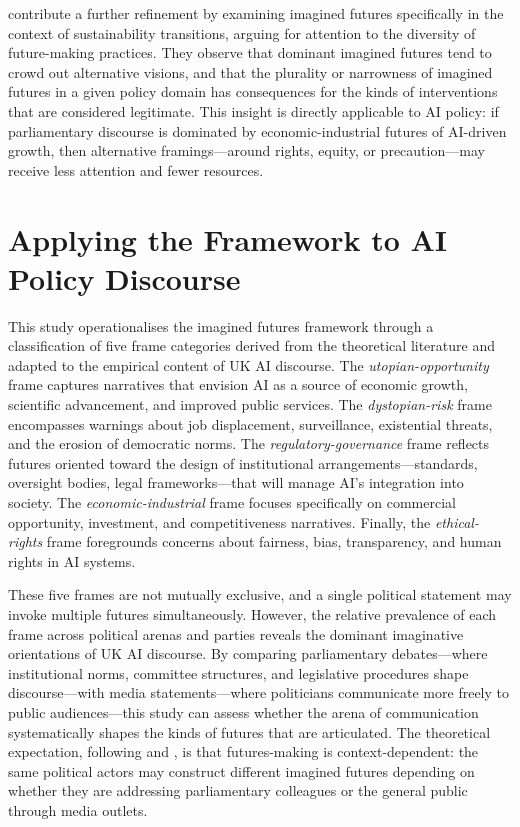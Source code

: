 \textcite{friedrich2024} contribute a further refinement by examining imagined futures specifically in the context of sustainability transitions, arguing for attention to the diversity of future-making practices. They observe that dominant imagined futures tend to crowd out alternative visions, and that the plurality or narrowness of imagined futures in a given policy domain has consequences for the kinds of interventions that are considered legitimate. This insight is directly applicable to AI policy: if parliamentary discourse is dominated by economic-industrial futures of AI-driven growth, then alternative framings---around rights, equity, or precaution---may receive less attention and fewer resources.

\section{Applying the Framework to AI Policy Discourse}

This study operationalises the imagined futures framework through a classification of five frame categories derived from the theoretical literature and adapted to the empirical content of UK AI discourse. The \textit{utopian-opportunity} frame captures narratives that envision AI as a source of economic growth, scientific advancement, and improved public services. The \textit{dystopian-risk} frame encompasses warnings about job displacement, surveillance, existential threats, and the erosion of democratic norms. The \textit{regulatory-governance} frame reflects futures oriented toward the design of institutional arrangements---standards, oversight bodies, legal frameworks---that will manage AI's integration into society. The \textit{economic-industrial} frame focuses specifically on commercial opportunity, investment, and competitiveness narratives. Finally, the \textit{ethical-rights} frame foregrounds concerns about fairness, bias, transparency, and human rights in AI systems.

These five frames are not mutually exclusive, and a single political statement may invoke multiple futures simultaneously. However, the relative prevalence of each frame across political arenas and parties reveals the dominant imaginative orientations of UK AI discourse. By comparing parliamentary debates---where institutional norms, committee structures, and legislative procedures shape discourse---with media statements---where politicians communicate more freely to public audiences---this study can assess whether the arena of communication systematically shapes the kinds of futures that are articulated. The theoretical expectation, following \textcite{suckert2022} and \textcite{thompson2022}, is that futures-making is context-dependent: the same political actors may construct different imagined futures depending on whether they are addressing parliamentary colleagues or the general public through media outlets.

